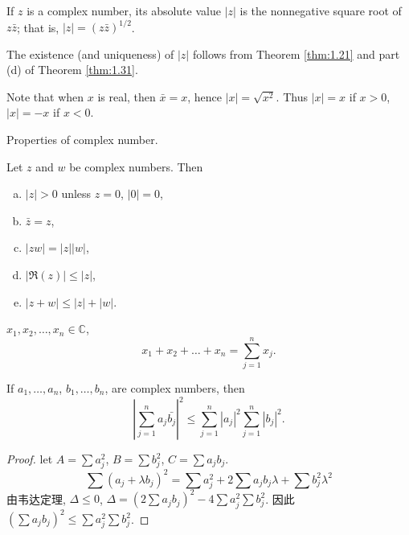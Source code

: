 \begin{mydef}
    \label{mydef:1.32}
    If $z$ is a complex number, 
    its absolute value $|z|$ is the nonnegative square root of $z\bar{z}$; 
    that is, $|z| = (z\bar{z})^{1/2}$.
\end{mydef}
The existence (and uniqueness) of $|z|$ follows from Theorem \ref{thm:1.21} and part (d) of Theorem \ref{thm:1.31}.

Note that when $x$ is real, then $\bar{x} = x$, 
hence $|x| = \sqrt{x^2}$. Thus $|x| = x$
if $x>0$, $|x| = -x$ if $x <0$.


Properties of complex number.

\begin{thm}
    \label{thm:1.33}
    Let $z$ and $w$ be complex numbers. Then
    \begin{enumerate}[(a)]
        \item $|z|>0$ unless $z=0$, $|0|=0$,
        \item $\bar{z}=z$,
        \item $|zw| = |z||w|$,
        \item $| \Re(z)| \leq |z|$,
        \item $|z+w| \leq|z|+|w|$.
    \end{enumerate}
\end{thm}


\begin{myNotation}
    \label{myNotation:1.34}
    $x_1,x_2,\dots,x_n \in \mathbb{C}$,
    \begin{equation*}
        x_1+x_2+\dots+x_n = \sum_{j=1}^{n} x_j.
    \end{equation*}
\end{myNotation}

\begin{thm}
    \label{thm:1.35}
    If 
    $a_1,\dots,a_n$, 
    $b_1,\dots,b_n$, are complex numbers, then
    \begin{equation*}
        \left| \sum_{j=1}^{n}a_j \bar{b_j}\right|^2 \leq 
        \sum_{j=1}^{n}\left|a_j\right|^2
        \sum_{j=1}^{n}\left|b_j\right|^2.
    \end{equation*}    
\end{thm}

\begin{proof}
    let $A = \sum a_j^2$, $B = \sum b_j^2$, $C = \sum a_j b_j$.
    \begin{equation*}
        \sum (a_j+\lambda b_j)^2 = 
        \sum a_j^2 
        + 2\sum a_j b_j \lambda
        + \sum b_j^2 \lambda^2
    \end{equation*}
    由韦达定理, $\Delta \leq 0$, 
    $\Delta= (2\sum a_j b_j )^2 - 4 \sum a_j^2\sum b_j^2$. 
    因此 $(\sum a_j b_j )^2 \leq \sum a_j^2\sum b_j^2$.
\end{proof}


